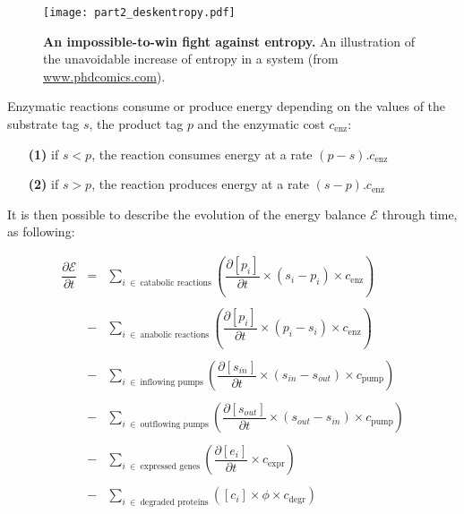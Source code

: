 \begin{figure}[!h]
\centering 
\texttt{[image: part2\_deskentropy.pdf]}
\caption[An impossible-to-win fight against entropy.]{\textbf{An impossible-to-win fight against entropy.} An illustration of the unavoidable increase of entropy in a system (from \href{www.phdcomics.com}{www.phdcomics.com}).}
\label{fig:part2:methodology:desk_entropy}
\end{figure}

Enzymatic reactions consume or produce energy depending on the values of the substrate tag $s$, the product tag $p$ and the enzymatic cost $c_{\text{enz}}$:
\begin{enumerate}
\item[\textbf{(1)}] if $s < p$, the reaction consumes energy at a rate $(p-s) . c_{\text{enz}}$
\item[\textbf{(2)}] if $s > p$, the reaction produces energy at a rate $(s-p) . c_{\text{enz}}$
\end{enumerate}

It is then possible to describe the evolution of the energy balance $\mathcal{E}$ through time, as following:

\begin{equation}
\label{eq:part2:methodology:energy_balance}
\left.
\begin{array}{rcl}
\dfrac{\partial \mathcal{E}}{\partial t} & = & \sum\limits_{i\ \in\ \text{catabolic reactions}} \left( \dfrac{\partial [p_i]}{\partial t} \times (s_i - p_i) \times c_{\text{enz}} \right)\\\\
& - & \sum\limits_{i\ \in\ \text{anabolic reactions}} \left( \dfrac{\partial [p_i]}{\partial t} \times (p_i - s_i) \times c_{\text{enz}} \right)\\\\
& - & \sum\limits_{i\ \in\ \text{inflowing pumps}} \left( \dfrac{\partial [s_{in}]}{\partial t} \times (s_{in} - s_{out}) \times c_{\text{pump}} \right)\\\\
& - & \sum\limits_{i\ \in\ \text{outflowing pumps}} \left( \dfrac{\partial [s_{out}]}{\partial t} \times (s_{out} - s_{in}) \times c_{\text{pump}} \right)\\\\
& - & \sum\limits_{i\ \in\ \text{expressed genes}} \left( \dfrac{\partial [e_i]}{\partial t} \times c_{\text{expr}} \right)\\\\
& - & \sum\limits_{i\ \in\ \text{degraded proteins}} \left( [c_i] \times \phi \times c_{\text{degr}} \right)
\end{array}
\right.
\end{equation}

